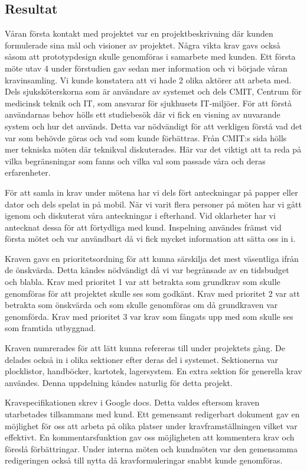 \subsection{Resultat}
Våran första kontakt med projektet var en projektbeskrivning där kunden formulerade sina mål och visioner av projektet. Några vikta krav gavs också såsom att prototypdesign skulle genomföras i samarbete med kunden. Ett första möte utav 4 under förstudien gav sedan mer information och vi började våran kravinsamling. Vi kunde konstatera att vi hade 2 olika aktörer att arbeta med. Dels  sjuksköterskorna som är användare av systemet och dels CMIT, Centrum för medicinsk teknik och IT, som ansvarar för sjukhusets IT-miljöer. För att förstå användarnas behov hölls ett studiebesök där vi fick en visning av nuvarande system och hur det används. Detta var nödvändigt för att verkligen förstå vad det var som behövde göras och vad som kunde förbättras. Från CMIT:s sida hölls mer tekniska möten där teknikval diskuterades. Här var det viktigt att ta reda på vilka begränsningar som fanns och vilka val som passade våra och deras erfarenheter.

För att samla in krav under mötena har vi dels fört anteckningar på papper eller dator och dels spelat in på mobil. När vi varit flera personer på möten har vi gått igenom och diskuterat våra anteckningar i efterhand. Vid oklarheter har vi antecknat dessa för att förtydliga med kund. Inspelning användes främst vid första mötet och var användbart då vi fick mycket information att sätta oss in i. 

Kraven gavs en prioritetsordning för att kunna särskilja det mest väsentliga ifrån de önskvärda. Detta kändes nödvändigt då vi var begränsade av en tidsbudget och blabla. Krav med prioritet 1 var att betrakta som grundkrav som skulle genomföras för att projektet skulle ses som godkänt. Krav med prioritet 2 var att betrakta som önskvärda och som skulle genomföras om då grundkraven var genomförda. Krav med prioritet 3 var krav som fångats upp med som skulle ses som framtida utbyggnad. 

Kraven numrerades för att lätt kunna refereras till under projektets gång. De delades också in i olika sektioner efter deras del i systemet. Sektionerna var plocklistor, handböcker, kartotek, lagersystem. En extra sektion för generella krav användes. Denna uppdelning kändes naturlig för detta projekt. 

Kravspecifikationen skrev i Google docs. Detta valdes eftersom kraven utarbetades tillsammans med kund. Ett gemensamt redigerbart dokument gav en möjlighet för oss att arbeta på olika platser under kravframställningen vilket var effektivt. En kommentarsfunktion gav oss möjligheten att kommentera krav och föreslå förbättringar. Under interna möten och kundmöten var den gemensamma redigeringen också till nytta då kravformuleringar snabbt kunde genomföras.

